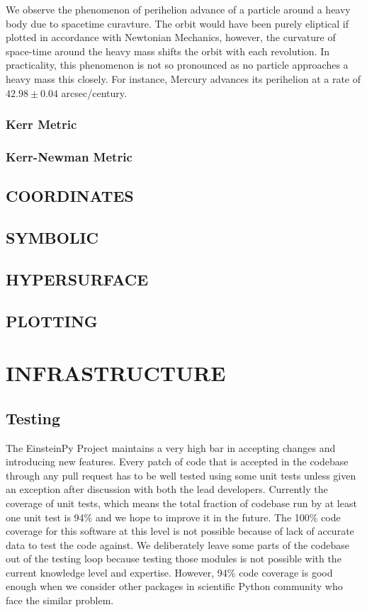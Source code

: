 \documentclass{aastex63}
\begin{document}
We observe the phenomenon of perihelion advance of a particle around a heavy body due to spacetime curavture. The orbit would have been purely eliptical if plotted in accordance with Newtonian Mechanics, however, the curvature of space-time around the heavy mass shifts the orbit with each revolution. In practicality, this phenomenon is not so pronounced as no particle approaches a heavy mass this closely. For instance, Mercury advances its perihelion at a rate of $42.98\pm 0.04$ arcsec/century.

\subsubsection{Kerr Metric}
\subsubsection{Kerr-Newman Metric}

\subsection{COORDINATES}
\subsection{SYMBOLIC}
\subsection{HYPERSURFACE}
\subsection{PLOTTING}

\section{INFRASTRUCTURE} \label{sec:INFRASTRUCTURE}
\subsection{ Testing} \label{subsec: Testing}
The EinsteinPy Project maintains a very high bar in accepting changes and introducing new features. Every patch of code that is accepted in the codebase through any pull request has to be well tested using some unit tests unless given an exception after discussion with both the lead developers. Currently the coverage of unit tests, which means the total fraction of codebase run by at least one unit test is 94\% and we hope to improve it in the future. The 100\% code coverage for this software at this level is not possible because of lack of accurate data to test the code against. We deliberately leave some parts of the codebase out of the testing loop because testing those modules is not possible with the current knowledge level and expertise. However, 94\% code coverage is good enough when we consider other packages in scientific Python community who face the similar problem.  
\end{document}
